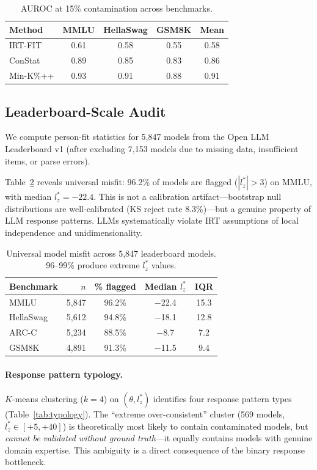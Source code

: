 \documentclass[11pt,a4paper]{article}
\begin{document}
\begin{table}[t]
\centering
\small
\begin{tabular}{lcccc}
\toprule
Method & MMLU & HellaSwag & GSM8K & Mean \\
\midrule
IRT-FIT & 0.61 & 0.58 & 0.55 & 0.58 \\
ConStat & 0.89 & 0.85 & 0.83 & 0.86 \\
Min-K\%++ & 0.93 & 0.91 & 0.88 & 0.91 \\
\bottomrule
\end{tabular}
\caption{AUROC at 15\% contamination across benchmarks.}
\label{tab:frontier_bench}
\end{table}

\subsection{Leaderboard-Scale Audit}
\label{sec:leaderboard}

We compute person-fit statistics for 5{,}847 models from the Open LLM Leaderboard v1 (after excluding 7{,}153 models due to missing data, insufficient items, or parse errors).

Table~\ref{tab:leaderboard} reveals universal misfit: 96.2\% of models are flagged ($|l_{z}^{*}| > 3$) on MMLU, with median $l_{z}^{*} = -22.4$.
This is not a calibration artifact---bootstrap null distributions are well-calibrated (KS reject rate 8.3\%)---but a genuine property of LLM response patterns.
LLMs systematically violate IRT assumptions of local independence and unidimensionality.

\begin{table}[t]
\centering
\small
\begin{tabular}{lrccc}
\toprule
Benchmark & $n$ & \% flagged & Median $l_{z}^{*}$ & IQR \\
\midrule
MMLU & 5{,}847 & 96.2\% & $-$22.4 & 15.3 \\
HellaSwag & 5{,}612 & 94.8\% & $-$18.1 & 12.8 \\
ARC-C & 5{,}234 & 88.5\% & $-$8.7 & 7.2 \\
GSM8K & 4{,}891 & 91.3\% & $-$11.5 & 9.4 \\
\bottomrule
\end{tabular}
\caption{Universal model misfit across 5{,}847 leaderboard models. 96--99\% produce extreme $l_{z}^{*}$ values.}
\label{tab:leaderboard}
\end{table}

\paragraph{Response pattern typology.}
$K$-means clustering ($k=4$) on $(\theta, l_{z}^{*})$ identifies four response pattern types (Table~\ref{tab:typology}).
The ``extreme over-consistent'' cluster (569 models, $l_{z}^{*} \in [+5, +40]$) is theoretically most likely to contain contaminated models, but \emph{cannot be validated without ground truth}---it equally contains models with genuine domain expertise.
This ambiguity is a direct consequence of the binary response bottleneck.
\end{document}
